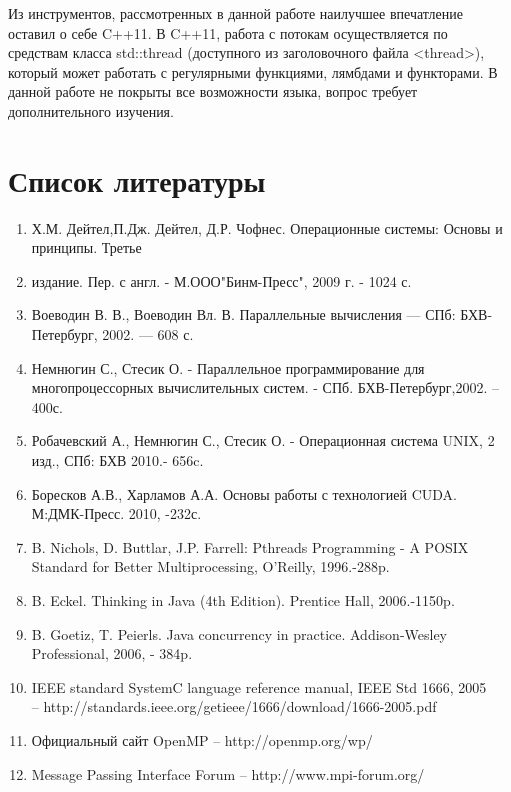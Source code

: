 \documentclass[a4paper, 12pt]{report}		%
\begin{document}
Из инструментов, рассмотренных в данной работе наилучшее впечатление оставил о себе C++11. В C++11, работа с потокам осуществляется по средствам класса std::thread (доступного из заголовочного файла <thread>), который может работать с регулярными функциями, лямбдами и функторами. В данной работе не покрыты все возможности языка, вопрос требует дополнительного изучения.


\chapter*{Список литературы}

\begin{enumerate}
    \item Х.М. Дейтел,П.Дж. Дейтел, Д.Р. Чофнес. Операционные системы: Основы и принципы. Третье     \item издание. Пер. с англ. - М.ООО"Бинм-Пресс", 2009 г. - 1024 с.
    \item Воеводин В. В., Воеводин Вл. В. Параллельные вычисления — СПб: БХВ-Петербург, 2002. — 608 с.
    \item Немнюгин С., Стесик О. - Параллельное программирование для многопроцессорных вычислительных систем. - СПб. БХВ-Петербург,2002. – 400с.
    \item Робачевский А., Немнюгин С., Стесик О. - Операционная система UNIX, 2 изд., СПб: БХВ 2010.- 656c.
    \item Боресков А.В., Харламов А.А. Основы работы с технологией CUDA. М:ДМК-Пресс. 2010, -232с.
    \item B. Nichols, D. Buttlar, J.P. Farrell: Pthreads Programming - A POSIX Standard for Better Multiprocessing, O'Reilly, 1996.-288p.
    \item B. Eckel. Thinking in Java (4th Edition). Prentice Hall, 2006.-1150p.
    \item B. Goetiz, T. Peierls. Java concurrency in practice. Addison-Wesley Professional, 2006, - 384p.
    \item IEEE standard SystemC language reference manual, IEEE Std 1666, 2005\\ – http://standards.ieee.org/getieee/1666/download/1666-2005.pdf
    \item Официальный сайт OpenMP – http://openmp.org/wp/
    \item Message Passing Interface Forum – http://www.mpi-forum.org/
\end{enumerate}
\end{document}
